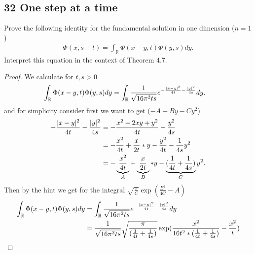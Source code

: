 \subsection*{32 One step at a time}
\begin{exercise}
 Prove the following identity for the fundamental solution in one dimension ($n=1$) 
 \begin{align*}
  \Phi(x,s+t) = \int_\mathbb{R} \Phi(x-y,t)\Phi(y,s) dy
 .\end{align*}
 Interpret this equation in the context of Theorem 4.7.
\end{exercise}
\begin{proof}
  We calculate  for $t,s>0$
  \begin{align*}
    \int_\mathbb{R} \Phi(x-y,t)\Phi(y,s) dy &= \int_\mathbb{R} \frac{1}{\sqrt{16\pi^2 ts} } e^{-\frac{\lvert x-y\rvert^2}{4t} - \frac{\lvert y\rvert^2}{4s}} dy
  .\end{align*}
  and for simplicity consider first  we want to get ($-A +By - Cy^2$)
  \begin{align*}
    -\frac{\lvert x-y\rvert^2}{4t} - \frac{\lvert y\rvert^2}{4s} &= -\frac{x^2-2xy+y^2}{4t} - \frac{y^2}{4s} \\
                                                   &=  -\frac{x^2}{4t} +\frac{x}{2t}*y - \frac{y^2}{4t} - \frac{1}{4s}y^2\\
                                                   &= -\underbrace{\frac{x^2}{4t}}_{A} +\underbrace{\frac{x}{2t}}_{B}*y - \underbrace{(\frac{1}{4t} + \frac{1}{4s})}_{C}y^2
  .\end{align*}
  Then by the hint we get for the integral $\sqrt{\frac{\pi}{C}} \exp(\frac{B^2}{4C}-A)$ 
  \begin{align*}
    \int_\mathbb{R} \Phi(x-y,t)\Phi(y,s) dy &= \int_\mathbb{R} \frac{1}{\sqrt{16\pi^2 ts} } e^{-\frac{\abs{x-y}^2}{4t} - \frac{\abs{y}^2}{4s}} dy\\
                                            &= \frac{1}{\sqrt{16\pi^2 ts} }  \sqrt{\frac{\pi }{(\frac{1}{4t}+\frac{1}{4s})}} \exp(\frac{x^{2} }{16t^2*(\frac{1}{4t}+\frac{1}{4s})}-\frac{x^2}{t})\\

\end{align*}
\end{proof}
